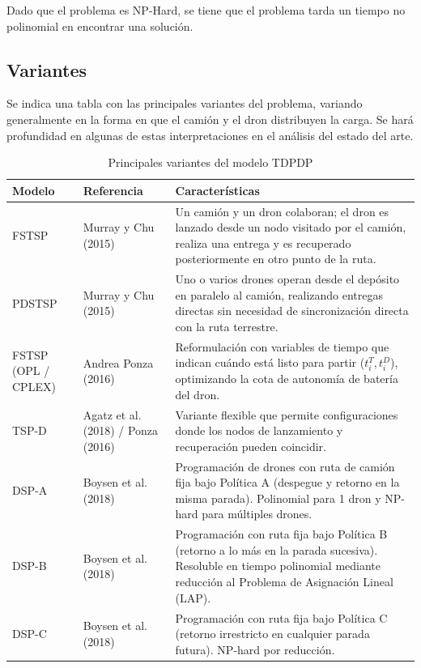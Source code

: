 Dado que el problema es NP-Hard, se tiene que el problema tarda un tiempo no polinomial en encontrar una solución.

\subsection{Variantes}

Se indica una tabla con las principales variantes del problema, variando generalmente en la forma en que el camión y el dron distribuyen la carga. Se hará profundidad en algunas de estas interpretaciones en el análisis del estado del arte.

\begin{table}[H]
\centering
\small
\caption{Principales variantes del modelo TDPDP}
\begin{tabular}{p{3.2cm}p{2.8cm}p{8.0cm}}
\hline
\textbf{Modelo} & \textbf{Referencia} & \textbf{Características} \\
\hline
FSTSP & Murray y Chu (2015) \cite{Murray2015Flying} & Un camión y un dron colaboran; el dron es lanzado desde un nodo visitado por el camión, realiza una entrega y es recuperado posteriormente en otro punto de la ruta. \\
\hline
PDSTSP & Murray y Chu (2015) \cite {Murray2015Flying} & Uno o varios drones operan desde el depósito en paralelo al camión, realizando entregas directas sin necesidad de sincronización directa con la ruta terrestre. \\
\hline
FSTSP (OPL / CPLEX) & Andrea Ponza (2016) \cite{ponza2016optimization} & Reformulación con variables de tiempo que indican cuándo está listo para partir ($t^T_i, t^D_i$), optimizando la cota de autonomía de batería del dron. \\
\hline
TSP-D & Agatz et al. (2018) / Ponza (2016) \cite{ponza2016optimization} & Variante flexible que permite configuraciones donde los nodos de lanzamiento y recuperación pueden coincidir. \\
\hline
DSP-A & Boysen et al. (2018) \cite{boysen2018drone} & Programación de drones con ruta de camión fija bajo Política A (despegue y retorno en la misma parada). Polinomial para 1 dron y NP-hard para múltiples drones. \\
\hline
DSP-B & Boysen et al. (2018) \cite{boysen2018drone} & Programación con ruta fija bajo Política B (retorno a lo más en la parada sucesiva). Resoluble en tiempo polinomial mediante reducción al Problema de Asignación Lineal (LAP). \\
\hline
DSP-C & Boysen et al. (2018) \cite{boysen2018drone} & Programación con ruta fija bajo Política C (retorno irrestricto en cualquier parada futura). NP-hard por reducción. \\

\end{tabular}
\end{table}
